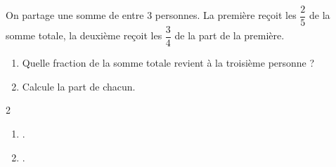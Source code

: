 \begin{exercice*}[Partage]
    On partage une somme de  entre $3$ personnes. La première reçoit les $\dfrac25$
    de la somme totale, la deuxième reçoit les $\dfrac34$ de la part de la première.
    \begin{enumerate}
        \item Quelle fraction de la somme totale revient à la troisième personne ?
        \item Calcule la part de chacun.
    \end{enumerate}
\end{exercice*}
\begin{corrige}
    \phantom{rrr}    
    \begin{multicols}2
        \begin{enumerate}
            \item .
            \item .
        \end{enumerate}
    \end{multicols}
\end{corrige}

